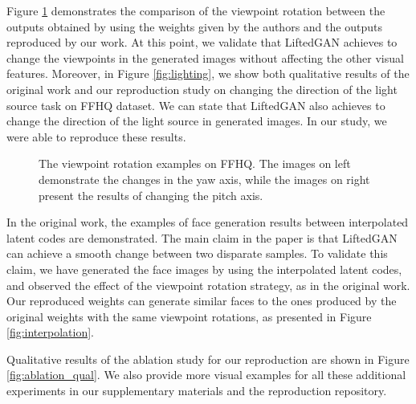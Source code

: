 Figure \ref{fig:rotation} demonstrates the comparison of the viewpoint rotation between the outputs obtained by using the weights given by the authors and the outputs reproduced by our work. At this point, we validate that LiftedGAN achieves to change the viewpoints in the generated images without affecting the other visual features. Moreover, in Figure \ref{fig:lighting}, we show both qualitative results of the original work and our reproduction study on changing the direction of the light source task on FFHQ dataset. We can state that LiftedGAN also achieves to change the direction of the light source in generated images. In our study, we were able to reproduce these results.

\begin{figure}[h!]%
    \centering
    \qquad
    \caption{The viewpoint rotation examples on FFHQ. The images on left demonstrate the changes in the yaw axis, while the images on right present the results of changing the pitch axis.}%
    \label{fig:rotation}%
\end{figure}

In the original work, the examples of face generation results between interpolated latent codes are demonstrated. The main claim in the paper is that LiftedGAN can achieve a smooth change between two disparate samples. To validate this claim, we have generated the face images by using the interpolated latent codes, and observed the effect of the viewpoint rotation strategy, as in the original work. Our reproduced weights can generate similar faces to the ones produced by the original weights with the same viewpoint rotations, as presented in Figure \ref{fig:interpolation}. 

Qualitative results of the ablation study for our reproduction are shown in Figure \ref{fig:ablation_qual}. We also provide more visual examples for all these additional experiments in our supplementary materials and the reproduction repository.


